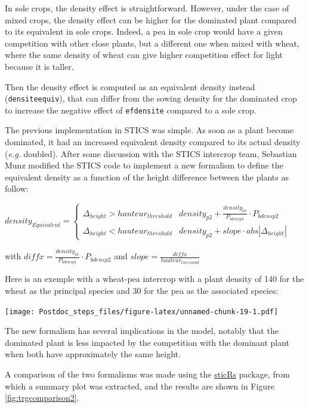 \documentclass[]{book}
\theoremstyle{definition}
\theoremstyle{definition}
\theoremstyle{definition}
\theoremstyle{remark}
\begin{document}
In sole crops, the density effect is straightforward. However, under the
case of mixed crops, the density effect can be higher for the dominated
plant compared to its equivalent in sole crops. Indeed, a pea in sole
crop would have a given competition with other close plants, but a
different one when mixed with wheat, where the same density of wheat can
give higher competition effect for light because it is taller.

Then the density effect is computed as an equivalent density instead
(\texttt{densiteequiv}), that can differ from the sowing density for the
dominated crop to increase the negative effect of \texttt{efdensite}
compared to a sole crop.

The previous implementation in STICS was simple. As soon as a plant
become dominated, it had an increased equivalent density compared to its
actual density (\emph{e.g.} doubled). After some discussion with the
STICS intercrop team, Sebastian Munz modified the STICS code to
implement a new formalism to define the equivalent density as a function
of the height difference between the plants as follow:

\(density_{Equivalent} =\begin{cases}\Delta_{height} > hauteur_{threshold} & density_{p2} + \frac{density_{p1}}{P_{bdensp1}}\cdot P_{bdensp2} \\ \Delta_{height} < hauteur_{threshold} & density_{p2}+slope\cdot abs\left|\Delta_{height}\right| \end{cases}\)

with \(diffx= \frac{density_{p1}}{P_{bdensp1}}\cdot P_{bdensp2}\) and
\(slope= \frac{diffx}{hauteur_{threshold}}\)

Here is an exemple with a wheat-pea intercrop with a plant density of
140 for the wheat as the principal species and 30 for the pea as the
associated species:

\texttt{[image: Postdoc\_steps\_files/figure-latex/unnamed-chunk-19-1.pdf]}

The new formalism has several implications in the model, notably that
the dominated plant is less impacted by the competition with the
dominant plant when both have approximately the same height.

A comparison of the two formalisms was made using the
\href{https://github.com/VEZY/sticRs}{sticRs} package, from which a
summary plot was extracted, and the results are shown in Figure
\ref{fig:trgcomparison2}.
\end{document}
